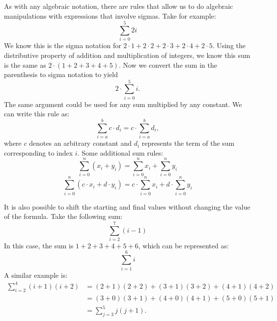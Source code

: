 As with any algebraic notation, there are rules that allow us to do algebraic manipulations with expressions that involve sigmas. 
Take for example:
\[\sum_{i=0}^{5}2i\]
We know this is the sigma notation for $2\cdot1+2\cdot2+2\cdot3+2\cdot4+2\cdot5$. Using the distributive property of addition and multiplication of integers, we know this sum is the same as $2\cdot(1+2+3+4+5)$.  Now we convert the sum in the parenthesis to sigma notation to yield
\[2\cdot\sum_{i=0}^{5}i.\]
The same argument could be used for any sum  multiplied by any constant. We can write this rule as:
\[\sum_{i=a}^{b} c \cdot d_i = c \cdot \sum_{i=a}^{b}  d_i,\]
where $c$ denotes an arbitrary constant and $d_i$ represents the term of the sum corresponding to index $i$.
Some additional sum rules:
\[ \sum_{i=0}^n \left(x_i +y_i \right) = \sum_{i=0}^n x_i + \sum_{i=0}^n y_i \]
\[ \sum_{i=0}^n \left(c \cdot x_i + d \cdot y_i \right) = c \cdot \sum_{i=0}^n x_i + d \cdot \sum_{i=0}^n y_i \]

It is also possible to shift 
the starting and final values without changing the value of the formula. Take the following sum:
\[\sum_{i=2}^{7}(i-1)\] 
In this case, the sum is
$1+2+3+4+5+6$, which can be represented as:
\[\sum_{i=1}^{6}i\] 
A similar example is:
\begin{align*}
\sum_{i=2}^{4}(i+1)(i+2)&=(2+1)(2+2) + (3+1)(3+2)+(4+1)(4+2) \\
 &=(3+0)(3+1) + (4+0)(4+1)+(5+0)(5+1) \\
&= \sum_{j=3}^{5}j(j+1).
\end{align*}
 
